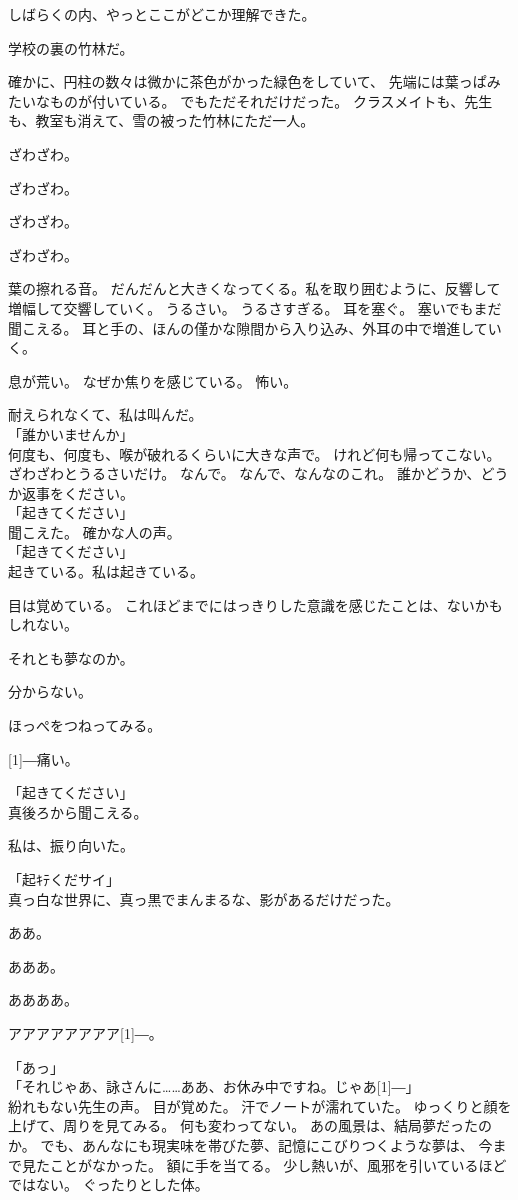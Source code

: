 \documentclass[../IHMain]{subfiles}
\begin{document}
しばらくの内、やっとここがどこか理解できた。

学校の裏の竹林だ。

確かに、円柱の数々は微かに茶色がかった緑色をしていて、
先端には葉っぱみたいなものが付いている。
でもただそれだけだった。
クラスメイトも、先生も、教室も消えて、雪の被った竹林にただ一人。

ざわざわ。

ざわざわ。

ざわざわ。

ざわざわ。

葉の擦れる音。
だんだんと大きくなってくる。私を取り囲むように、反響して増幅して交響していく。
うるさい。
うるさすぎる。
耳を塞ぐ。
塞いでもまだ聞こえる。
耳と手の、ほんの僅かな隙間から入り込み、外耳の中で増進していく。

息が荒い。
なぜか焦りを感じている。
怖い。

耐えられなくて、私は叫んだ。\\
「誰かいませんか」\\
何度も、何度も、喉が破れるくらいに大きな声で。
けれど何も帰ってこない。
ざわざわとうるさいだけ。
なんで。
なんで、なんなのこれ。
誰かどうか、どうか返事をください。\\
「起きてください」\\
聞こえた。
確かな人の声。\\
「起きてください」\\
起きている。私は起きている。

目は覚めている。
これほどまでにはっきりした意識を感じたことは、ないかもしれない。

それとも夢なのか。

分からない。

ほっぺをつねってみる。

\scalebox{3}[1]{―}痛い。

「起きてください」\\
真後ろから聞こえる。

私は、振り向いた。

「起ｷﾃくだサイ」\\
真っ白な世界に、真っ黒でまんまるな、影があるだけだった。

ああ。

あああ。

ああああ。

アアアアアアアア\scalebox{3}[1]{―}。

「あっ」\\
「それじゃあ、詠さんに……ああ、お休み中ですね。じゃあ\scalebox{3}[1]{―}」\\
紛れもない先生の声。
目が覚めた。
汗でノートが濡れていた。
ゆっくりと顔を上げて、周りを見てみる。
何も変わってない。
あの風景は、結局夢だったのか。
でも、あんなにも現実味を帯びた夢、記憶にこびりつくような夢は、
今まで見たことがなかった。
額に手を当てる。
少し熱いが、風邪を引いているほどではない。
ぐったりとした体。
\end{document}

